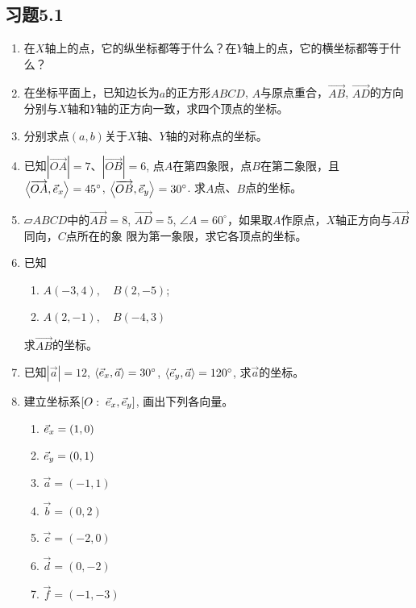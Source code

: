 \subsection*{习题5.1}
\begin{enumerate}
    \item 在$X$轴上的点，它的纵坐标都等于什么？在$Y$轴上的点，它的横坐标都等于什么？
    \item 在坐标平面上，已知边长为$a$的正方形$ABCD$, $A$与原点重合，$\Vec{AB}$, $\Vec{AD}$的方向分别与$X$轴和$Y$轴的正方向一致，求四个顶点的坐标。
    \item 分别求点$(a,b)$关于$X$轴、$Y$轴的对称点的坐标。
    \item 已知$|\Vec{OA}|=7$、$|\Vec{OB}|=6$, 点$A$在第四象限，点$B$在第二象限，且$\left\langle \overrightarrow{OA},\vec{e}_x \right\rangle=45^{\circ}$, $\left\langle \overrightarrow{OB},\vec{e}_y \right\rangle=30^{\circ}$. 求$A$点、$B$点的坐标。
    \item $\parallelogram{ABCD}$中的$\Vec{AB}=8$, $\Vec{AD}=5$, $\angle A=60^{\circ}$，如果取$A$作原点，$X$轴正方向与$\Vec{AB}$同向，$C$点所在的象
    限为第一象限，求它各顶点的坐标。
    \item 已知
\begin{multicols}{2}
\begin{enumerate}
    \item $A(-3, 4),\quad B(2,-5)$; 
    \item $A(2,-1),\quad B(-4, 3)$
\end{enumerate}
\end{multicols}
    求$\Vec{AB}$的坐标。
    
\item 已知$|\vec{a}|=12$, $\left\langle \vec{e}_x,\vec{a} \right\rangle=30^{\circ}$, $\left\langle \vec{e}_y,\vec{a} \right\rangle=120^{\circ}$, 
    求$\vec{a}$的坐标。
    
    \item 建立坐标系$[O:\; \vec{e}_x,\vec{e}_y]$, 画出下列各向量。
\begin{multicols}{3}
\begin{enumerate}
    \item $\vec{e}_x=(1,0)$
    \item $\vec{e}_y=(0,1)$
    \item $\vec{a}=(-1,1)$
    \item $\vec{b}=(0,2)$
    \item $\vec{c}=(-2,0)$
    \item $\vec{d}=(0,-2)$
    \item $\vec{f}=(-1,-3)$
\end{enumerate}
\end{multicols}


\end{enumerate}
